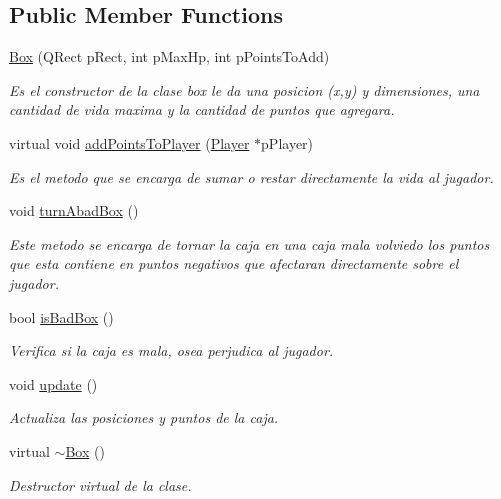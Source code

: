 \subsection*{Public Member Functions}
\begin{DoxyCompactItemize}
\item 
\hyperlink{class_box_a12c7c3f710d76e599a31e7a41784f613}{Box} (Q\-Rect p\-Rect, int p\-Max\-Hp, int p\-Points\-To\-Add)
\begin{DoxyCompactList}\small\item\em Es el constructor de la clase box le da una posicion (x,y) y dimensiones, una cantidad de vida maxima y la cantidad de puntos que agregara. \end{DoxyCompactList}\item 
virtual void \hyperlink{class_box_a536c605982fc2000fbda0388d0a2fb2b}{add\-Points\-To\-Player} (\hyperlink{class_player}{Player} $\ast$p\-Player)
\begin{DoxyCompactList}\small\item\em Es el metodo que se encarga de sumar o restar directamente la vida al jugador. \end{DoxyCompactList}\item 
\hypertarget{class_box_a82b510b4e487f29189b19699ebaaebae}{void \hyperlink{class_box_a82b510b4e487f29189b19699ebaaebae}{turn\-Abad\-Box} ()}\label{class_box_a82b510b4e487f29189b19699ebaaebae}

\begin{DoxyCompactList}\small\item\em Este metodo se encarga de tornar la caja en una caja mala volviedo los puntos que esta contiene en puntos negativos que afectaran directamente sobre el jugador. \end{DoxyCompactList}\item 
bool \hyperlink{class_box_a1d84b0a091465889a6e587c4f9072482}{is\-Bad\-Box} ()
\begin{DoxyCompactList}\small\item\em Verifica si la caja es mala, osea perjudica al jugador. \end{DoxyCompactList}\item 
\hypertarget{class_box_a779104150a6f06da2bf1500489a58530}{void \hyperlink{class_box_a779104150a6f06da2bf1500489a58530}{update} ()}\label{class_box_a779104150a6f06da2bf1500489a58530}

\begin{DoxyCompactList}\small\item\em Actualiza las posiciones y puntos de la caja. \end{DoxyCompactList}\item 
\hypertarget{class_box_a6a5e09398e85d602a046b429062fb9c2}{virtual \hyperlink{class_box_a6a5e09398e85d602a046b429062fb9c2}{$\sim$\-Box} ()}\label{class_box_a6a5e09398e85d602a046b429062fb9c2}

\begin{DoxyCompactList}\small\item\em Destructor virtual de la clase. \end{DoxyCompactList}\end{DoxyCompactItemize}
